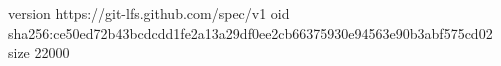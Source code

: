 version https://git-lfs.github.com/spec/v1
oid sha256:ce50ed72b43bcdcdd1fe2a13a29df0ee2cb66375930e94563e90b3abf575cd02
size 22000
